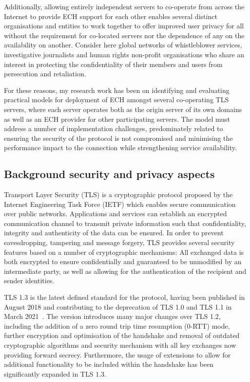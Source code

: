 \documentclass[a4paper,oneside,12pt]{article}
\begin{document}
Additionally, allowing entirely independent servers to co-operate from across the Internet to provide ECH support for each other enables several distinct organisations and entities to work together to offer improved user privacy for all without the requirement for co-located servers nor the dependence of any on the availability on another. Consider here global networks of whistleblower services, investigative journalists and human rights non-profit organisations who share an interest in protecting the confidentiality of their members and users from persecution and retaliation.

For these reasons, my research work has been on identifying and evaluating practical models for deployment of ECH amongst several co-operating TLS servers, where each server operates both as the origin server of its own domains as well as an ECH provider for other participating servers. The model must address a number of implementation challenges, predominately related to ensuring the security of the protocol is not compromised and minimising the performance impact to the connection while strengthening service availability.


\subsection*{Background security and privacy aspects}

Transport Layer Security (TLS) is a cryptographic protocol proposed by the Internet Engineering Task Force (IETF) which enables secure communication over public networks. Applications and services can establish an encrypted communication channel to transmit private information such that confidentiality, integrity and authenticity of the data can be ensured. In order to prevent eavesdropping, tampering and message forgery, TLS provides several security features based on a number of cryptographic mechanisms: All exchanged data is both encrypted to ensure confidentially and guaranteed to be unmodified by an intermediate party, as well as allowing for the authentication of the recipient and sender identities.

TLS 1.3 is the latest defined standard for the protocol, having been published in August 2018 and contributing to the deprecation of TLS 1.0 and TLS 1.1 in March 2021~\cite{rfc8446, rfc8996}. The version introduces many major changes over TLS 1.2, including the addition of a zero round trip time resumption (0-RTT) mode, further encryption and optimisation of the handshake and removal of outdated cryptographic algorithms and security mechanism with all key exchanges now providing forward secrecy. Furthermore, the usage of extensions to allow for additional functionality to be included within the handshake has been significantly expanded in TLS 1.3.
\end{document}

